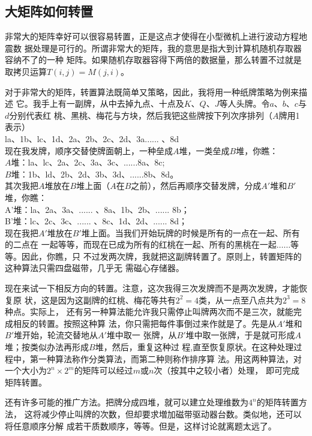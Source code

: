 \subsection{大矩阵如何转置}
\label{sec:1.6.2}

非常大的矩阵幸好可以很容易转置，正是这点才使得在小型微机上进行波动方程地震数
据处理是可行的。所谓非常大的矩阵，我的意思是指大到计算机随机存取器容纳不了的一种
矩阵。如果随机存取器容得下两倍的数据量，那么转置不过就是取拷贝运算$T(i,j)=M(j,i)$。

对于非常大的矩阵，转置算法既简单又策略，因此，我将用一种纸牌策略为例来描述
它。我手上有一副牌，从中去掉九点、十点及$K$、$Q$、$J$等人头牌。令$a$、$b$、$c$与$d$分别代表红
桃、黑桃、梅花与方块，然后我钯这些牌按下列次序排列（$A$牌用1表示）\\
la、1b、lc、1d、2a、2b、2c、2d、3a...... 、8d\\
现在我发牌，顺序交替使牌面朝上，一种垒成$A$堆，一类垒成$B$堆，你瞧：\\
$A$堆：la、lc、2a、2c、3a、3c、......8a、8c;\\
$B$堆：1b、ld、2b、2d、3b、3d、......8b、8d。\\
其次我把$A$堆放在$B$堆上面（$A$在$B$之前），然后再顺序交替发牌，分成$A'$堆和$B'$堆，你瞧：\\
A'堆：la、2a、3a、...... 、8a、1b、2b、...... 8b；\\
B'堆：lc、2c、3c、...... 、8c、1d、2d、...... 8d；\\
现在我把$A'$堆放在$B'$堆上面。当我们开始玩牌的时候是所有的一点在一起、所有的二点在
一起等等，而现在已成为所有的红桃在一起、所有的黑桃在一起$\ldots\ldots$等等。因此，你瞧，只
不过发两次牌，我就把这副牌转置了。原则上，转置矩阵的这种算法只需四盘磁带，几乎无
需磁心存储器。

现在来试一下相反方向的转置。注意，这次我得三次发牌而不是两次发牌，才能恢复原
状，这是因为这副牌的红桃、梅花等共有$2^2=4$类，从一点至八点共为$2^3=8$种点。实际上，
还有另一种算法能允许我只需停止叫牌两次而不是三次，就能完成相反的转置。按照这种算
法，你只需把每件事倒过来作就是了。先是从$A'$堆和$B'$堆开始，轮流交替地从$A'$堆中取一
张牌，从$B'$堆中取一张牌，于是就可形成$A$堆；按类似办法再形成$B$堆，然后，重复这种过
程,直至恢复原状。在这种处理过程中，第一种算法称作分类算法，而第二种则称作排序算
法。用这两种算法，对一个大小为$2^n\times 2^m$的矩阵可以经过$m$或$n$次（按其中之较小者）处理，
即可完成矩阵转置。

还有许多可能的推广方法。把牌分成四堆，就可以建立处理维数为$4^n$的矩阵转置方法，
这将减少停止叫牌的次数，但却要求増加磁带驱动器台数。类似地，还可以将任意顺序分解
成若干质数顺序，等等。但是，这样讨论就离题太远了。


